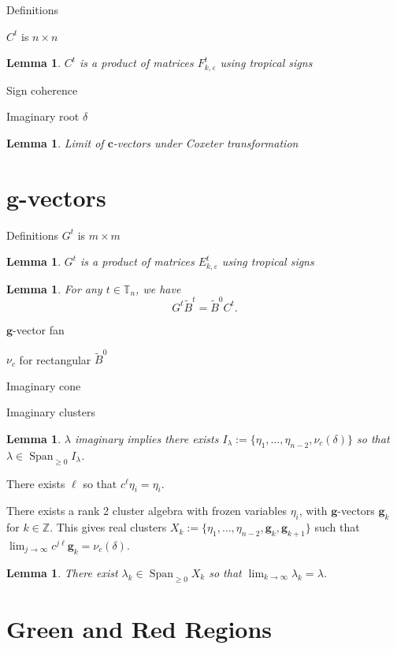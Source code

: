 \documentclass{amsart}
\newtheorem{lemma}[theorem]{Lemma}
\numberwithin{theorem}{section}
\newcommand{\bfc}{\boldsymbol{c}}
\newcommand{\bfg}{\boldsymbol{g}}
\newcommand{\TT}{\mathbb{T}}
\newcommand{\ZZ}{\mathbb{Z}}
\newcommand{\Span}{{\operatorname{Span}}}
\begin{document}
  Definitions

  $C^t$ is $n\times n$
  \begin{lemma}
    $C^t$ is a product of matrices $F^t_{k,\varepsilon}$ using tropical signs
  \end{lemma}

  Sign coherence

  Imaginary root $\delta$

  \begin{lemma}
    Limit of $\bfc$-vectors under Coxeter transformation
  \end{lemma}


  \section{$\bfg$-vectors}
  Definitions $G^t$ is $m\times m$
  \begin{lemma}
    $G^t$ is a product of matrices $E^t_{k,\varepsilon}$ using tropical signs
  \end{lemma}

  \begin{lemma}
    For any $t\in\TT_n$, we have
    \[G^t\tilde B^t=\tilde B^0 C^t.\]
  \end{lemma}

  $\bfg$-vector fan

  $\nu_c$ for rectangular $\tilde B^0$

  Imaginary cone

  Imaginary clusters
  \begin{lemma}
    $\lambda$ imaginary implies there exists $I_\lambda:=\{\eta_1,\ldots,\eta_{n-2},\nu_c(\delta)\}$ so that $\lambda\in\Span_{\ge0} I_\lambda$.
  \end{lemma}

  There exists $\ell$ so that $c^\ell\eta_i=\eta_i$.

  There exists a rank 2 cluster algebra with frozen variables $\eta_i$, with $\bfg$-vectors $\bfg_k$ for $k\in\ZZ$.
  This gives real clusters $X_k:=\{\eta_1,\ldots,\eta_{n-2},\bfg_k,\bfg_{k+1}\}$ such that $\lim_{j\to\infty} c^{j\ell}\bfg_k=\nu_c(\delta)$.

  \begin{lemma}
    There exist $\lambda_k\in\Span_{\ge0} X_k$ so that $\lim_{k\to\infty} \lambda_k=\lambda$.
  \end{lemma}


  \section{Green and Red Regions}
\end{document}
